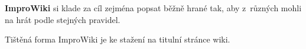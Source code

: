 \needspace{5cm} \label{improwiki} \textbf{ImproWiki} si klade za cíl zejména popsat běžně hrané   tak, aby  z~různých  mohli na  hrát podle stejných pravidel. 
 
Tištěná forma ImproWiki je ke stažení na titulní stránce wiki. 
